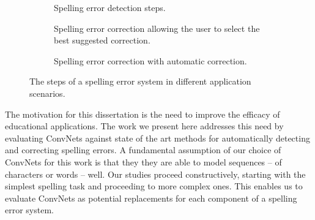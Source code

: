\begin{figure}
\centering
  \begin{subfigure}{\textwidth}
  \centering
  \caption{Spelling error detection steps.} 
  \label{fig:SpellingErrorSystemCheck}
  \end{subfigure}
  
  \begin{subfigure}{\textwidth}
  \centering
  \caption{Spelling error correction allowing the user to select the best suggested correction.} 
  \label{fig:SpellingErrorSystemSuggest}
  \end{subfigure}
  
  \begin{subfigure}{\textwidth}
  \centering
  \caption{Spelling error correction with automatic correction.}
  \label{fig:SpellingErrorSystemCorrect}
  \end{subfigure}
\caption{The steps of a spelling error system in different application scenarios.}
\label{fig:SpellingErrorSystemSteps}
\end{figure}

The motivation for this dissertation is the need to improve the efficacy of educational applications.  The work we present here addresses this need by evaluating ConvNets against state of the art methods for automatically detecting and correcting spelling errors.  A fundamental assumption of our choice of ConvNets for this work is that they they are able to model sequences -- of characters or words -- well.  Our studies proceed constructively, starting with the simplest spelling task and proceeding to more complex ones.  This enables us to evaluate ConvNets as potential replacements for each component of a spelling error system. 

